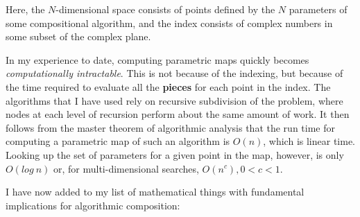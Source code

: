 \documentclass[11pt]{scrartcl}
\begin{document}
\begin{description}
Here, the $N$-dimensional space consists of points defined by the $N$ parameters of some compositional algorithm, and the index consists of complex numbers in some subset of the complex plane.

In my experience to date, computing parametric maps quickly becomes \emph{computationally intractable}. This is not because of the indexing, but because of the time required to evaluate all the \textbf{pieces} for each point in the index. The algorithms that I have used rely on recursive subdivision of the problem, where nodes at each level of recursion perform about the same amount of work. It then follows from the master theorem of algorithmic analysis  \parencite{bentley1980general, drmota2013master} that the run time for computing a parametric map of such an algorithm is $O(n)$, which is linear time. Looking up the set of parameters for a given point in the map, however, is only $O(log\ n)$ or, for multi-dimensional searches, $O(n^{c}), 0 < c < 1$.
 \end{description}

I have now added to my list of mathematical things with fundamental implications for algorithmic composition:
\end{document}
